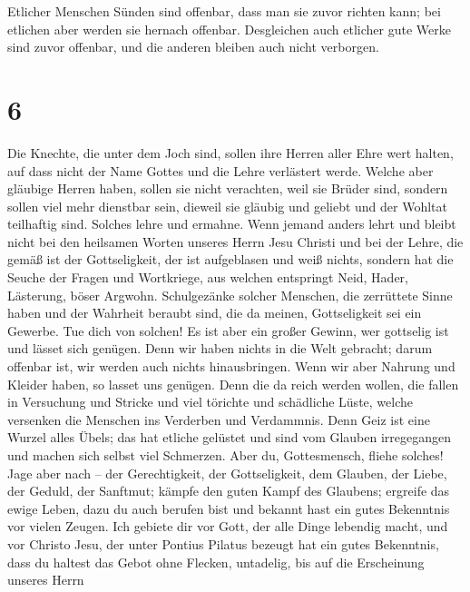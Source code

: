  Etlicher Menschen Sünden sind offenbar, dass man sie
zuvor richten kann; bei etlichen aber werden sie hernach offenbar.
 Desgleichen auch etlicher gute Werke sind zuvor
offenbar, und die anderen bleiben auch nicht verborgen.

\hypertarget{section-5}{%
\section{6}\label{section-5}}

 Die Knechte, die unter dem Joch sind, sollen ihre Herren
aller Ehre wert halten, auf dass nicht der Name Gottes und die Lehre
verlästert werde.  Welche aber gläubige Herren haben,
sollen sie nicht verachten, weil sie Brüder sind, sondern sollen viel
mehr dienstbar sein, dieweil sie gläubig und geliebt und der Wohltat
teilhaftig sind. Solches lehre und ermahne.  Wenn jemand
anders lehrt und bleibt nicht bei den heilsamen Worten unseres Herrn
Jesu Christi und bei der Lehre, die gemäß ist der Gottseligkeit,
 der ist aufgeblasen und weiß nichts, sondern hat die
Seuche der Fragen und Wortkriege, aus welchen entspringt Neid, Hader,
Lästerung, böser Argwohn.  Schulgezänke solcher Menschen,
die zerrüttete Sinne haben und der Wahrheit beraubt sind, die da meinen,
Gottseligkeit sei ein Gewerbe. Tue dich von solchen!  Es
ist aber ein großer Gewinn, wer gottselig ist und lässet sich genügen.
 Denn wir haben nichts in die Welt gebracht; darum
offenbar ist, wir werden auch nichts hinausbringen.  Wenn
wir aber Nahrung und Kleider haben, so lasset uns genügen.
 Denn die da reich werden wollen, die fallen in Versuchung
und Stricke und viel törichte und schädliche Lüste, welche versenken die
Menschen ins Verderben und Verdammnis.  Denn Geiz ist
eine Wurzel alles Übels; das hat etliche gelüstet und sind vom Glauben
irregegangen und machen sich selbst viel Schmerzen.  Aber
du, Gottesmensch, fliehe solches! Jage aber nach -- der Gerechtigkeit,
der Gottseligkeit, dem Glauben, der Liebe, der Geduld, der Sanftmut;
 kämpfe den guten Kampf des Glaubens; ergreife das ewige
Leben, dazu du auch berufen bist und bekannt hast ein gutes Bekenntnis
vor vielen Zeugen.  Ich gebiete dir vor Gott, der alle
Dinge lebendig macht, und vor Christo Jesu, der unter Pontius Pilatus
bezeugt hat ein gutes Bekenntnis,  dass du haltest das
Gebot ohne Flecken, untadelig, bis auf die Erscheinung unseres Herrn
